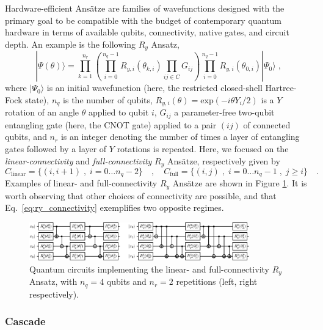 \documentclass[aps,pra,onecolumn]{revtex4-2}
\newcommand{\ry}{R_y}
\begin{document}
Hardware-efficient Ans\"{a}tze are families of wavefunctions designed with the primary goal to be compatible with the budget of contemporary quantum hardware 
in terms of available qubits, connectivity, native gates, and circuit depth.
An example is the following $\ry$ Ansatz,
\begin{equation}
| \Psi(\theta) \rangle = 
\prod_{k=1}^{n_r}
\left(
\prod_{i=0}^{n_q-1} R_{y,i}(\theta_{k,i})
\prod_{ij\in C} G_{ij}
\right)
\prod_{i=0}^{n_q-1} R_{y,i}(\theta_{0,i}) | \Psi_0 \rangle
\;,
\end{equation}
where $| \Psi_0 \rangle$ is an initial wavefunction (here, the restricted 
closed-shell Hartree-Fock state), $n_q$ is the number of qubits, $R_{y,i}(\theta) 
= \mbox{exp}(-i \theta Y_i/2)$ is a $Y$ rotation of an angle $\theta$ 
applied to qubit $i$, $G_{ij}$ a parameter-free two-qubit entangling 
gate (here, the CNOT gate) applied to a pair $(ij)$ of connected qubits,
and $n_r$ is an integer denoting the number of times a layer of entangling gates
followed by a layer of $Y$ rotations is repeated.
Here, we focused on the {\em{linear-connectivity}} and {\em{full-connectivity}} $\ry$ Ans\"{a}tze, respectively given by
\begin{equation}
\label{eq:ry_connectivity}
C_{\mathrm{linear}} = \{ (i,i+1) \;,\; i = 0 \dots n_q-2 \}
\quad,\quad
C_{\mathrm{full}} = \{ (i,j) \;,\; i = 0 \dots n_q-1 \;,\; j \geq i \}
\quad.
\end{equation}
Examples of linear- and full-connectivity $\ry$ Ans\"{a}tze are shown in Figure \ref{figure:ry}. 
It is worth observing that other choices of connectivity are possible, and that Eq.~\eqref{eq:ry_connectivity} exemplifies
two opposite regimes.

\begin{figure}[t!]
\includegraphics[width=0.85\textwidth]{../figures/circuits/ry.eps}
\caption{Quantum circuits implementing the linear- and full-connectivity $\ry$ Ansatz, with $n_q=4$ qubits and $n_r=2$ repetitions (left, right respectively).}
\label{figure:ry}
\end{figure} 

\subsubsection{Cascade}
\end{document}
